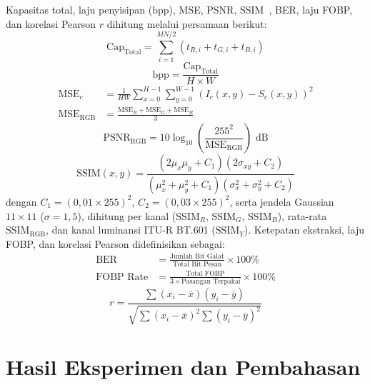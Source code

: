 \documentclass[12pt,journal]{IEEEtran}
\begin{document}
Kapasitas total, laju penyisipan ($\text{bpp}$), MSE, PSNR, SSIM~\cite{wang2004image}, BER, laju FOBP, dan korelasi Pearson $r$ dihitung melalui persamaan berikut:
\begin{equation}
\text{Cap}_{\text{Total}} = \sum_{i=1}^{MN/2} \left(t_{R,i} + t_{G,i} + t_{B,i}\right)
\label{eq:cap}
\end{equation}
\begin{equation}
\text{bpp} = \frac{\text{Cap}_{\text{Total}}}{H \times W}
\label{eq:bpp}
\end{equation}
\begin{align}
\text{MSE}_c &= \frac{1}{HW} \sum_{x=0}^{H-1} \sum_{y=0}^{W-1} \left(I_c(x,y) - S_c(x,y)\right)^2 \label{eq:mse_c}\\
\text{MSE}_{\text{RGB}} &= \frac{\text{MSE}_R + \text{MSE}_G + \text{MSE}_B}{3} \label{eq:mse}
\end{align}
\begin{equation}
\text{PSNR}_{\text{RGB}} = 10 \log_{10}\left(\frac{255^2}{\text{MSE}_{\text{RGB}}}\right)\text{ dB}
\label{eq:psnr}
\end{equation}
\begin{equation}
\text{SSIM}(x,y) = \frac{(2\mu_x\mu_y + C_1)(2\sigma_{xy} + C_2)}{(\mu_x^2 + \mu_y^2 + C_1)(\sigma_x^2 + \sigma_y^2 + C_2)}
\label{eq:ssim}
\end{equation}
dengan $C_1 = (0{,}01 \times 255)^2$, $C_2 = (0{,}03 \times 255)^2$, serta jendela Gaussian $11 \times 11$ ($\sigma = 1{,}5$), dihitung per kanal ($\text{SSIM}_R$, $\text{SSIM}_G$, $\text{SSIM}_B$), rata-rata $\text{SSIM}_{\text{RGB}}$, dan kanal luminansi ITU-R BT.601 ($\text{SSIM}_Y$). Ketepatan ekstraksi, laju FOBP, dan korelasi Pearson didefinisikan sebagai:
\begin{align}
\text{BER} &= \frac{\text{Jumlah Bit Galat}}{\text{Total Bit Pesan}} \times 100\% \label{eq:ber}\\
\text{FOBP Rate} &= \frac{\text{Total FOBP}}{3 \times \text{Pasangan Terpakai}} \times 100\% \label{eq:ber_fobp}
\end{align}
\begin{equation}
r = \frac{\sum (x_i - \bar{x})(y_i - \bar{y})}{\sqrt{\sum (x_i - \bar{x})^2 \sum (y_i - \bar{y})^2}}
\label{eq:pearson}
\end{equation}

\FloatBarrier

\section{Hasil Eksperimen dan Pembahasan}
\end{document}
